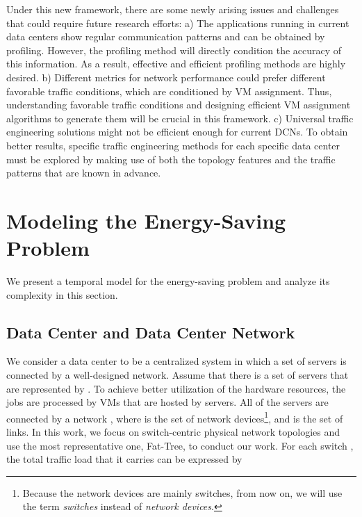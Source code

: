 \documentclass[journal,single-space,two column,twoside,10pt]{IEEEtran}
\begin{document}
Under this new framework, there are some newly arising issues and challenges that could require future research efforts: 
a) The applications running in current data centers show regular communication patterns and can be obtained by profiling. However, the profiling method will directly condition the accuracy of this information. As a result, effective and efficient profiling methods are highly desired.
b) Different metrics for network performance could prefer different favorable traffic conditions, which are conditioned by VM assignment. Thus, understanding favorable traffic conditions and designing efficient VM assignment algorithms to generate them will be crucial in this framework. 
c) Universal traffic engineering solutions might not be efficient enough for current DCNs. To obtain better results, specific traffic engineering methods for each specific data center must be explored by making use of both the topology features and the traffic patterns that are known in advance.


\section{Modeling the Energy-Saving Problem}
\label{sec:model}

We present a temporal model for the energy-saving problem and analyze its complexity in this section.

\vspace{-0.3cm}

\subsection{Data Center and Data Center Network}
\label{sec:DCandDCN}

We consider a data center to be a centralized system in which a set of servers is connected by a well-designed network. Assume that there is a set of servers that are represented by . To achieve better utilization of the hardware resources, the jobs are processed by VMs that are hosted by servers. All of the servers are connected by a network , where  is the set of network devices\footnote{Because the network devices are mainly switches, from now on, we will use the term \emph{switches} instead of \emph{network devices}.}, and  is the set of links. In this work, we focus on switch-centric physical network topologies and use the most representative one, Fat-Tree, to conduct our work. For each switch , the total traffic load that it carries can be expressed by
\end{document}
